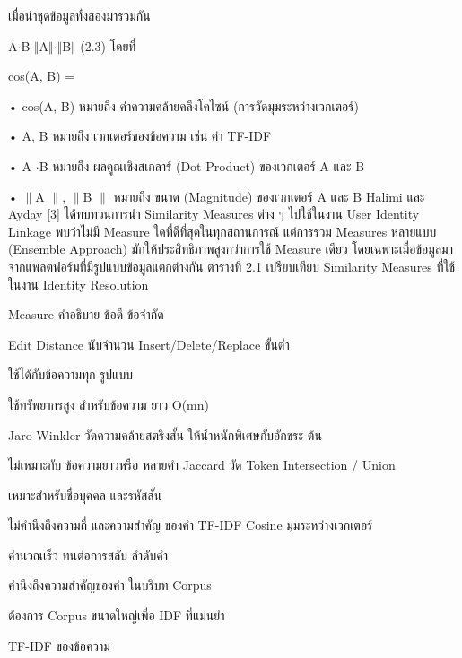 \documentclass[12pt,a4paper]{report}
\begin{document}
เมื่อนำชุดข้อมูลทั้งสองมารวมกัน\par
A\ensuremath{\cdot}B \ensuremath{\Vert}A\ensuremath{\Vert}\ensuremath{\cdot}\ensuremath{\Vert}B\ensuremath{\Vert} (2.3) โดยที่\par
cos(A, B) =\par
\noindent • cos(A, B) หมายถึง ค่าความคล้ายคลึงโคไซน์ (การวัดมุมระหว่างเวกเตอร์)\par
\noindent • A, B หมายถึง เวกเตอร์ของข้อความ เช่น ค่า TF-IDF\par
\noindent • A \ensuremath{\cdot}B หมายถึง ผลคูณเชิงสเกลาร์ (Dot Product) ของเวกเตอร์ A และ B\par
\noindent • \ensuremath{\parallel}A \ensuremath{\parallel}, \ensuremath{\parallel}B \ensuremath{\parallel} หมายถึง ขนาด (Magnitude) ของเวกเตอร์ A และ B Halimi และ Ayday [3] ได้ทบทวนการนำ Similarity Measures ต่าง ๆ ไปใช้ในงาน User Identity Linkage พบว่าไม่มี Measure ใดที่ดีที่สุดในทุกสถานการณ์ แต่การรวม Measures หลายแบบ (Ensemble Approach) มักให้ประสิทธิภาพสูงกว่าการใช้ Measure เดียว โดยเฉพาะเมื่อข้อมูลมาจากแพลตฟอร์มที่มีรูปแบบข้อมูลแตกต่างกัน ตารางที่ 2.1 เปรียบเทียบ Similarity Measures ที่ใช้ในงาน Identity Resolution\par
Measure คำอธิบาย ข้อดี ข้อจำกัด\par
Edit Distance นับจำนวน Insert/Delete/Replace ขั้นต่ำ\par
ใช้ได้กับข้อความทุก รูปแบบ\par
ใช้ทรัพยากรสูง สำหรับข้อความ ยาว O(mn)\par
Jaro-Winkler วัดความคล้ายสตริงสั้น ให้น้ำหนักพิเศษกับอักขระ ต้น\par
ไม่เหมาะกับ ข้อความยาวหรือ หลายคำ Jaccard วัด Token Intersection / Union\par
เหมาะสำหรับชื่อบุคคล และรหัสสั้น\par
ไม่คำนึงถึงความถี่ และความสำคัญ ของคำ TF-IDF Cosine มุมระหว่างเวกเตอร์\par
คำนวณเร็ว ทนต่อการสลับ ลำดับคำ\par
คำนึงถึงความสำคัญของคำ ในบริบท Corpus\par
ต้องการ Corpus ขนาดใหญ่เพื่อ IDF ที่แม่นยำ\par
TF-IDF ของข้อความ\par
\clearpage
\end{document}
